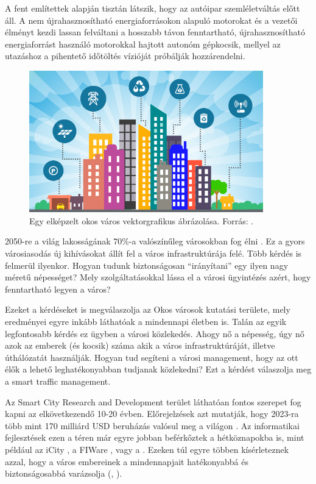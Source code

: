 \documentclass[a4paper,12pt]{report}
\begin{document}
\vspace{2mm}
A fent említettek alapján tisztán látszik, hogy az autóipar szemléletváltás előtt áll. A nem újrahasznosítható energiaforrásokon alapuló motorokat és a vezetői élményt kezdi lassan felváltani a hosszabb távon fenntartható, újrahasznosítható energiaforrást használó motorokkal hajtott autonóm gépkocsik, mellyel az utazáshoz a pihentető időtöltés vízióját próbálják hozzárendelni.

\begin{figure}[ht]
\centerline{
\includegraphics[width=4in]{img/smartcitylogo}}
\caption{Egy elképzelt okos város vektorgrafikus ábrázolása. Forrás: \cite{smartcitylogo}.}
\label{smartcitylogo}
\end{figure}

\vspace{2mm}
2050-re a világ lakosságának 70\%-a valószínűleg városokban fog élni \cite{unpopulation}. Ez a gyors városiasodás új kihívásokat állít fel a város infrastruktúrája felé. Több kérdés is felmerül ilyenkor. Hogyan tudunk biztonságosan ``irányítani'' egy ilyen nagy méretű népességet? Mely szolgáltatásokkal lássa el a városi ügyintézés azért, hogy fenntartható legyen a város? 

\vspace{2mm}
Ezeket a kérdéseket is megválaszolja az Okos városok kutatási területe, mely eredményei egyre inkább láthatóak a mindennapi életben is. Talán az egyik legfontosabb kérdés ez ügyben a városi közlekedés. Ahogy nő a népesség, úgy nő azok az emberek (és kocsik) száma akik a város infrastruktúráját, illetve úthálózatát használják. Hogyan tud segíteni a városi management, hogy az ott élők a lehető leghatékonyabban tudjanak közlekedni? Ezt a kérdést válaszolja meg a smart traffic management.

\vspace{2mm}
Az Smart City Research and Development terület láthatóan fontos szerepet fog kapni az elkövetkezendő 10-20 évben. Előrejelzések azt mutatják, hogy 2023-ra több mint 170 milliárd USD beruházás valósul meg a világon \cite{navigant}. Az informatikai fejlesztések ezen a téren már egyre jobban beférkőztek a hétköznapokba is, mint például az iCity \cite{icity}, a FI\-Ware \cite{fiware}, vagy a \cite{vital}. Ezeken túl egyre többen kísérleteznek azzal, hogy a város embereinek a mindennapjait hatékonyabbá és biztonságosabbá varázsolja (\cite{myneighbourhood}, \cite{smartsantander}).
\end{document}
